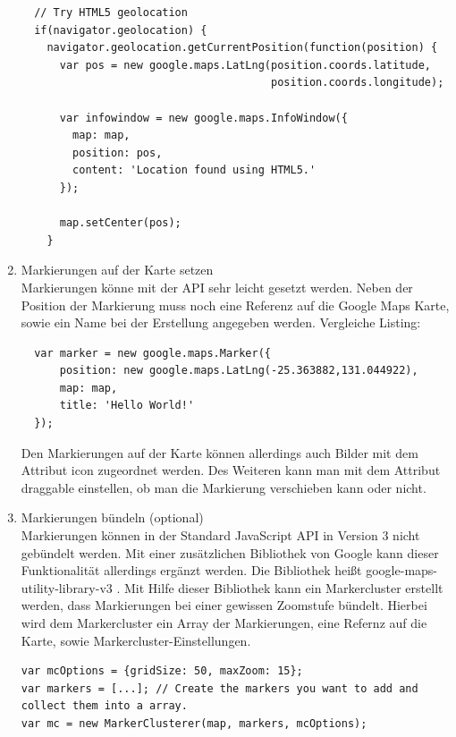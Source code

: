 \begin{enumerate}
\begin{lstlisting}
  // Try HTML5 geolocation
  if(navigator.geolocation) {
    navigator.geolocation.getCurrentPosition(function(position) {
      var pos = new google.maps.LatLng(position.coords.latitude,
                                       position.coords.longitude);

      var infowindow = new google.maps.InfoWindow({
        map: map,
        position: pos,
        content: 'Location found using HTML5.'
      });

      map.setCenter(pos);
    }
\end{lstlisting} \cite[Codebeispiel Geolocation]{googlemaps}

\item Markierungen auf der Karte setzen\\
Markierungen könne mit der API sehr leicht gesetzt werden. Neben der Position der Markierung muss noch eine Referenz auf die Google Maps Karte, sowie ein Name bei der Erstellung angegeben werden. Vergleiche Listing:

\begin{lstlisting}
  var marker = new google.maps.Marker({
      position: new google.maps.LatLng(-25.363882,131.044922),
      map: map,
      title: 'Hello World!'
  });

\end{lstlisting} \cite[Codebeispiel Simple Markers]{googlemaps}

Den Markierungen auf der Karte können allerdings auch Bilder mit dem Attribut \glqq icon \grqq zugeordnet werden. Des Weiteren kann man mit dem Attribut \glqq draggable \grqq einstellen, ob man die Markierung verschieben kann oder nicht.

\item Markierungen bündeln (optional)\\
Markierungen können in der Standard JavaScript API in Version 3 nicht gebündelt werden. 
Mit einer zusätzlichen Bibliothek  von Google kann dieser Funktionalität allerdings ergänzt werden. Die Bibliothek heißt \glqq google-maps-utility-library-v3 \grqq. 
Mit Hilfe dieser Bibliothek kann ein \glqq Markercluster \grqq erstellt werden, dass Markierungen bei einer gewissen Zoomstufe bündelt. Hierbei wird dem Markercluster ein Array der Markierungen, eine Refernz auf die Karte, sowie Markercluster-Einstellungen.
\begin{lstlisting}
var mcOptions = {gridSize: 50, maxZoom: 15};
var markers = [...]; // Create the markers you want to add and collect them into a array.
var mc = new MarkerClusterer(map, markers, mcOptions);
\end{lstlisting}
\cite{googlecluster}

\end{enumerate}





